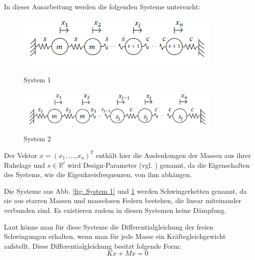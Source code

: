 \documentclass[a4paper,12pt]{report}
\newcommand{\R}{\mathbb R}
\newcommand{\zitat}[1]{\glqq #1\grqq}
\newcommand{\1}{\mathds{1}}
\theoremstyle{plain} %
\theoremstyle{definition} %
\theoremstyle{remark}
\begin{document}
      In dieser Ausarbeitung werden die folgenden Systeme untersucht:
      \begin{figure}[ht]
            \centering
            \begin{minipage}[ht]{0.49\linewidth}
                  \centering
                  \includegraphics[width=0.9\textwidth, keepaspectratio]{./System1.png}
                  \caption{System 1}
                  \label{fig: System 1}
            \end{minipage}
            \hfill
            \begin{minipage}[ht]{0.49\linewidth}
                  \centering
                  \includegraphics[width=0.9\textwidth, keepaspectratio]{./System2.png}
                  \caption{System 2}
                  \label{fig: System 2}
            \end{minipage}
      \end{figure}

      Der Vektor $x = (x_1,\dots,x_n)^T$ enthält hier die Auslenkungen der Massen aus ihrer Ruhelage und $s\in\R^l$ wird Design-Parameter (vgl. \cite[S. 2]{hauptteilTkachuk}) genannt, da die Eigenschaften des Systems, wie die Eigenkreisfrequenzen, von ihm abhängen.

      Die Systeme aus Abb. \ref{fig: System 1} und \ref{fig: System 2} werden \zitat{Schwingerketten}\cite[S. 236]{maschinendynamikDresig} genannt, da sie aus starren Massen und masselosen Federn bestehen, die linear miteinander verbunden sind.
      Es existieren zudem in diesen Systemen keine Dämpfung.
      
      Laut \cite[S. 362-365]{maschinendynamikDresig} könne man für diese Systeme die \zitat{Differentialgleichung der freien Schwingungen}\cite[S. 365]{maschinendynamikDresig} erhalten, wenn man für jede Masse ein Kräftegleichgewicht aufstellt.
      Diese Differentialgleichung besitzt folgende Form:
      \begin{equation}
            \label{eqn: Dgl freie Schwingungen}
            Kx+M\ddot x = 0
      \end{equation}
\end{document}
